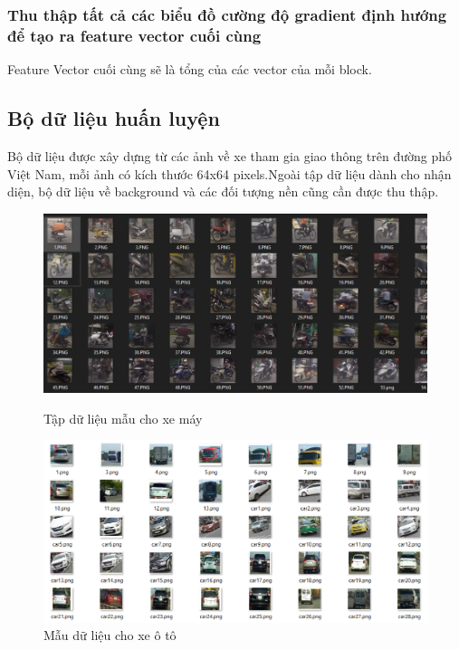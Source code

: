 \documentclass[10pt,conference,a4paper]{IEEEtran}
\makeatletter
\def\ScaleIfNeeded{\ifdim\Gin@nat@width>\linewidth\linewidth\else\Gin@nat@width\fi}
\makeatother
\begin{document}
\subsubsection{Thu thập tất cả các biểu đồ cường độ gradient định hướng để tạo ra feature vector cuối cùng}
Feature Vector cuối cùng sẽ là tổng của các vector của mỗi block.

\subsection{Bộ dữ liệu huấn luyện}
Bộ dữ liệu được xây dựng từ các ảnh về xe tham gia giao thông trên đường phố Việt Nam, mỗi ảnh có kích thước 64x64 pixels.Ngoài tập dữ liệu dành cho nhận diện, bộ dữ liệu về background và các đối tượng nền cũng cần được thu thập.
\begin{figure}[ht]
	\centering
	\includegraphics[width=\ScaleIfNeeded]{data}
	\caption{Tập dữ liệu mẫu cho xe máy}
	\label{fig:data}
	\centering
	\includegraphics[width=\ScaleIfNeeded, height=0.5\linewidth]{data3}
	\caption{Mẫu dữ liệu cho xe ô tô}
	\label{fig:data3}
	\centering

\end{figure}
\end{document}
